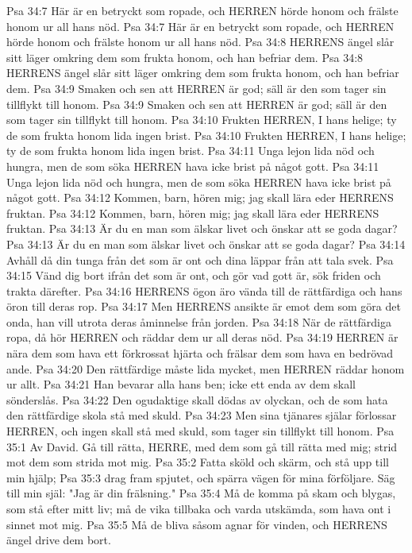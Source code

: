 Psa 34:7  Här är en betryckt som ropade, och HERREN hörde honom och frälste honom ur all hans nöd.
Psa 34:7  Här är en betryckt som ropade, och HERREN hörde honom och frälste honom ur all hans nöd.
Psa 34:8  HERRENS ängel slår sitt läger omkring dem som frukta honom, och han befriar dem.
Psa 34:8  HERRENS ängel slår sitt läger omkring dem som frukta honom, och han befriar dem.
Psa 34:9  Smaken och sen att HERREN är god; säll är den som tager sin tillflykt till honom.
Psa 34:9  Smaken och sen att HERREN är god; säll är den som tager sin tillflykt till honom.
Psa 34:10  Frukten HERREN, I hans helige; ty de som frukta honom lida ingen brist.
Psa 34:10  Frukten HERREN, I hans helige; ty de som frukta honom lida ingen brist.
Psa 34:11  Unga lejon lida nöd och hungra, men de som söka HERREN hava icke brist på något gott.
Psa 34:11  Unga lejon lida nöd och hungra, men de som söka HERREN hava icke brist på något gott.
Psa 34:12  Kommen, barn, hören mig; jag skall lära eder HERRENS fruktan.
Psa 34:12  Kommen, barn, hören mig; jag skall lära eder HERRENS fruktan.
Psa 34:13  Är du en man som älskar livet och önskar att se goda dagar?
Psa 34:13  Är du en man som älskar livet och önskar att se goda dagar?
Psa 34:14  Avhåll då din tunga från det som är ont och dina läppar från att tala svek.
Psa 34:15  Vänd dig bort ifrån det som är ont, och gör vad gott är, sök friden och trakta därefter.
Psa 34:16  HERRENS ögon äro vända till de rättfärdiga och hans öron till deras rop.
Psa 34:17  Men HERRENS ansikte är emot dem som göra det onda, han vill utrota deras åminnelse från jorden.
Psa 34:18  När de rättfärdiga ropa, då hör HERREN och räddar dem ur all deras nöd.
Psa 34:19  HERREN är nära dem som hava ett förkrossat hjärta och frälsar dem som hava en bedrövad ande.
Psa 34:20  Den rättfärdige måste lida mycket, men HERREN räddar honom ur allt.
Psa 34:21  Han bevarar alla hans ben; icke ett enda av dem skall sönderslås.
Psa 34:22  Den ogudaktige skall dödas av olyckan, och de som hata den rättfärdige skola stå med skuld.
Psa 34:23  Men sina tjänares själar förlossar HERREN, och ingen skall stå med skuld, som tager sin tillflykt till honom.
Psa 35:1  Av David. Gå till rätta, HERRE, med dem som gå till rätta med mig; strid mot dem som strida mot mig.
Psa 35:2  Fatta sköld och skärm, och stå upp till min hjälp;
Psa 35:3  drag fram spjutet, och spärra vägen för mina förföljare. Säg till min själ: "Jag är din frälsning."
Psa 35:4  Må de komma på skam och blygas, som stå efter mitt liv; må de vika tillbaka och varda utskämda, som hava ont i sinnet mot mig.
Psa 35:5  Må de bliva såsom agnar för vinden, och HERRENS ängel drive dem bort.
